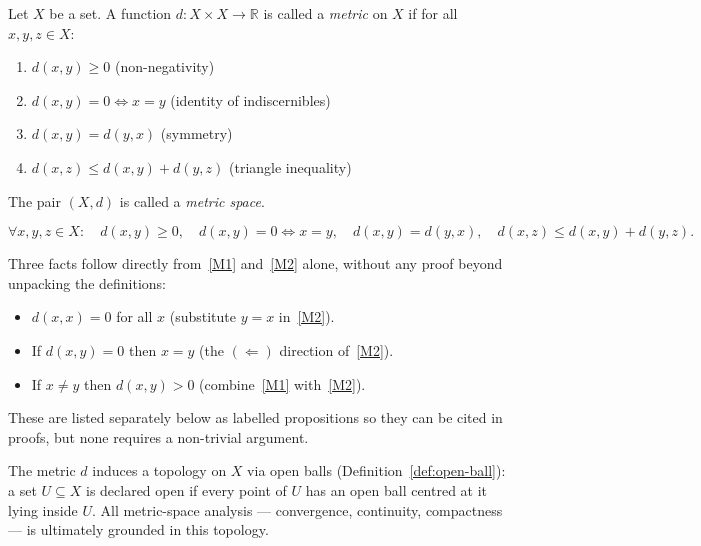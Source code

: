 \begin{tcolorbox}[colback=propbox, colframe=propborder, arc=2pt,
  left=6pt, right=6pt, top=4pt, bottom=4pt,
  title={\small\textbf{Definition (Metric)}},
  fonttitle=\small\bfseries]
\begin{definition}[Metric]
\label{def:metric}
Let $X$ be a set. A function $d : X \times X \to \mathbb{R}$
is called a \emph{metric} on $X$ if for all $x,y,z \in X$:
\begin{enumerate}[label=(M\arabic*)]
  \item\label{M1} $d(x,y) \ge 0$ \hfill (non-negativity)
  \item\label{M2} $d(x,y) = 0 \iff x = y$ \hfill (identity of indiscernibles)
  \item\label{M3} $d(x,y) = d(y,x)$ \hfill (symmetry)
  \item\label{M4} $d(x,z) \le d(x,y) + d(y,z)$ \hfill (triangle inequality)
\end{enumerate}
The pair $(X,d)$ is called a \emph{metric space}.
\end{definition}
\end{tcolorbox}

\begin{remark*}
\[
\forall x,y,z \in X:\quad
d(x,y) \ge 0,\quad
d(x,y)=0 \!\iff\! x=y,\quad
d(x,y)=d(y,x),\quad
d(x,z) \le d(x,y)+d(y,z).
\]
\end{remark*}

\begin{remark*}
Three facts follow directly from~\ref{M1} and~\ref{M2} alone,
without any proof beyond unpacking the definitions:
\begin{itemize}
  \item $d(x,x) = 0$ for all $x$ \quad (substitute $y = x$ in~\ref{M2}).
  \item If $d(x,y) = 0$ then $x = y$ \quad (the $(\Leftarrow)$ direction of~\ref{M2}).
  \item If $x \neq y$ then $d(x,y) > 0$ \quad (combine~\ref{M1} with~\ref{M2}).
\end{itemize}
These are listed separately below as labelled propositions so they can be
cited in proofs, but none requires a non-trivial argument.
\end{remark*}

\begin{remark*}
The metric $d$ induces a topology on $X$ via open balls
(Definition~\ref{def:open-ball}): a set $U \subseteq X$ is declared open
if every point of $U$ has an open ball centred at it lying inside $U$.
All metric-space analysis --- convergence, continuity, compactness ---
is ultimately grounded in this topology.
\end{remark*}

